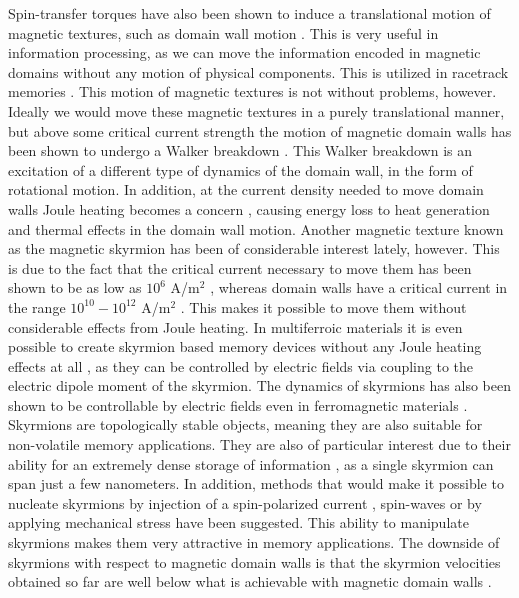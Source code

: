 Spin-transfer torques have also been shown to induce a translational motion of magnetic textures, such as domain wall motion \cite{Gan2000,Vernier2004}. This is very useful in information processing, as we can move the information encoded in magnetic domains without any motion of physical components. This is utilized in racetrack memories \cite{Parkin2008}. This motion of magnetic textures is not without problems, however. Ideally we would move these magnetic textures in a purely translational manner, but above some critical current strength the motion of magnetic domain walls has been shown to undergo a Walker breakdown \cite{SchryerWalker1974}. This Walker breakdown is an excitation of a different type of dynamics of the domain wall, in the form of rotational motion. In addition, at the current density needed to move domain walls Joule heating becomes a concern \cite{Yamaguchi2005}, causing energy loss to heat generation and thermal effects in the domain wall motion. Another magnetic texture known as the magnetic skyrmion has been of considerable interest lately, however. This is due to the fact that the critical current necessary to move them has been shown to be as low as $10^6$ A/m$^2$ \cite{Jonietz2010,Schulz2012,Yu2012}, whereas domain walls have a critical current in the range $10^{10}-10^{12}$ A/m$^2$ \cite{Grollier2003,Parkin2008}. This makes it possible to move them without considerable effects from Joule heating. In multiferroic materials it is even possible to create skyrmion based memory devices without any Joule heating effects at all \cite{Mochizuki2015}, as they can be controlled by electric fields via coupling to the electric dipole moment of the skyrmion. The dynamics of skyrmions has also been shown to be controllable by electric fields even in ferromagnetic materials \cite{Upadhyaya2015}.  Skyrmions are topologically stable objects, meaning  they are also suitable for non-volatile memory applications. They are also of particular interest due to their ability for an extremely dense storage of information \cite{Fert2013}, as a single skyrmion can span just a few nanometers. In addition, methods that would make it possible to nucleate skyrmions by injection of a spin-polarized current \cite{Sampaio2013}, spin-waves \cite{Liu2015} or by applying mechanical stress \cite{Nii2015} have been suggested. This ability to manipulate skyrmions makes them very attractive in memory applications. The downside of skyrmions with respect to magnetic domain walls is that the skyrmion velocities obtained so far are well below what is achievable with magnetic domain walls \cite{Fert2013,Yang2015}. 

